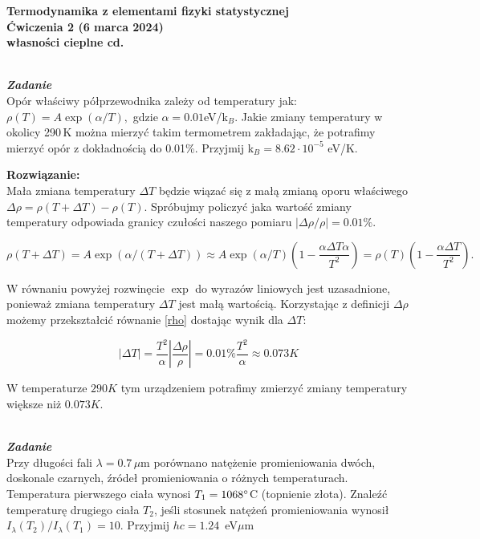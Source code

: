 \documentclass[11pt,a4paper]{article}
\newcounter{zadanie}\newcommand{\zadanie}[1][]{\addtocounter{zadanie}{1} ~\\  {\bf \emph{Zadanie \arabic{zadanie} #1 }} \\}
\begin{document}
\vspace*{-1.8cm}

\begin{centering}
\bf{\Large{Termodynamika z elementami fizyki statystycznej}}\\
Ćwiczenia 2 (6 marca 2024)\\[1mm]
własności cieplne cd. \\
\end{centering}

\zadanie
Opór właściwy półprzewodnika zależy od temperatury jak:
$ \rho(T) = A \exp{(\alpha / T)}, $ 
gdzie $\alpha = 0.01$eV/k$_B$.
Jakie zmiany temperatury  w okolicy 290\,K można mierzyć takim termometrem
zakładając, że potrafimy mierzyć opór z dokładnością do 0.01\%.
Przyjmij k$_B = 8.62 \cdot 10^{-5}$ eV/K.

\vskip 10pt
\textbf{Rozwiązanie:}\\
Mała zmiana temperatury $\Delta T$ będzie wiązać się z małą zmianą oporu właściwego
$\Delta \rho = \rho(T+\Delta T) - \rho(T)$. Spróbujmy policzyć jaka wartość zmiany temperatury
odpowiada granicy czułości naszego pomiaru $|\Delta \rho/\rho| = 0.01\%$.

\begin{equation}
  \rho(T+\Delta T) = A \exp(\alpha/(T+\Delta T)) \approx A\exp(\alpha/T)
  \left(1-\frac{\alpha \Delta T \alpha}{T^2}\right) =
  \rho(T)\left(1 - \frac{\alpha \Delta T }{T^2}\right).\label{rho}
\end{equation}

W równaniu powyżej rozwinęcie $\exp$ do wyrazów liniowych jest uzasadnione,
ponieważ zmiana temperatury $\Delta T$ jest małą wartością. Korzystając z
definicji $\Delta\rho$ możemy przekształcić równanie \eqref{rho} dostając wynik dla $\Delta T$: 

\begin{equation}
|\Delta T| = \frac{T^2}{\alpha} \left|\frac{\Delta \rho}{\rho}\right| = 0.01\% \frac{T^2}{\alpha} \approx 0.073 K
\end{equation}

W temperaturze $290K$ tym urządzeniem potrafimy zmierzyć zmiany temperatury większe niż $0.073 K$.

\newpage

\zadanie
Przy długości fali $\lambda = 0.7\,\mu$m porównano natężenie promieniowania dwóch,
doskonale czarnych, źródeł promieniowania o różnych temperaturach.
Temperatura pierwszego ciała wynosi $T_1 = 1068 \degree$C (topnienie złota). 
Znaleźć temperaturę drugiego ciała $T_2$, jeśli stosunek natężeń promieniowania 
wynosił $I_\lambda (T_2)/I_\lambda (T_1) = 10$.
Przyjmij $hc = 1.24$~eV$\mu$m
\end{document}
